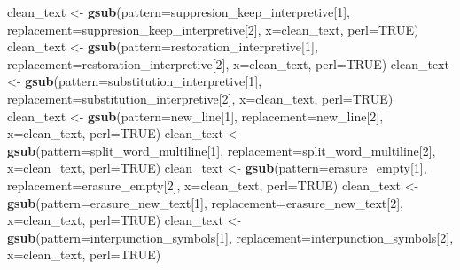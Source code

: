\documentclass[]{article}
\newenvironment{Shaded}{\begin{snugshade}}{\end{snugshade}}
\newcommand{\DataTypeTok}[1]{\textcolor[rgb]{0.13,0.29,0.53}{#1}}
\newcommand{\DecValTok}[1]{\textcolor[rgb]{0.00,0.00,0.81}{#1}}
\newcommand{\KeywordTok}[1]{\textcolor[rgb]{0.13,0.29,0.53}{\textbf{#1}}}
\newcommand{\NormalTok}[1]{#1}
\newcommand{\OtherTok}[1]{\textcolor[rgb]{0.56,0.35,0.01}{#1}}
\newcommand{\StringTok}[1]{\textcolor[rgb]{0.31,0.60,0.02}{#1}}
\begin{document}
\begin{Shaded}
\begin{Highlighting}[]
\NormalTok{  clean_text <-}\StringTok{ }\KeywordTok{gsub}\NormalTok{(}\DataTypeTok{pattern=}\NormalTok{suppresion_keep_interpretive[}\DecValTok{1}\NormalTok{], }\DataTypeTok{replacement=}\NormalTok{suppresion_keep_interpretive[}\DecValTok{2}\NormalTok{], }\DataTypeTok{x=}\NormalTok{clean_text, }\DataTypeTok{perl=}\OtherTok{TRUE}\NormalTok{)}
\NormalTok{  clean_text <-}\StringTok{ }\KeywordTok{gsub}\NormalTok{(}\DataTypeTok{pattern=}\NormalTok{restoration_interpretive[}\DecValTok{1}\NormalTok{], }\DataTypeTok{replacement=}\NormalTok{restoration_interpretive[}\DecValTok{2}\NormalTok{], }\DataTypeTok{x=}\NormalTok{clean_text, }\DataTypeTok{perl=}\OtherTok{TRUE}\NormalTok{)}
\NormalTok{  clean_text <-}\StringTok{ }\KeywordTok{gsub}\NormalTok{(}\DataTypeTok{pattern=}\NormalTok{substitution_interpretive[}\DecValTok{1}\NormalTok{], }\DataTypeTok{replacement=}\NormalTok{substitution_interpretive[}\DecValTok{2}\NormalTok{], }\DataTypeTok{x=}\NormalTok{clean_text, }\DataTypeTok{perl=}\OtherTok{TRUE}\NormalTok{)}
\NormalTok{  clean_text <-}\StringTok{ }\KeywordTok{gsub}\NormalTok{(}\DataTypeTok{pattern=}\NormalTok{new_line[}\DecValTok{1}\NormalTok{], }\DataTypeTok{replacement=}\NormalTok{new_line[}\DecValTok{2}\NormalTok{], }\DataTypeTok{x=}\NormalTok{clean_text, }\DataTypeTok{perl=}\OtherTok{TRUE}\NormalTok{)}
\NormalTok{  clean_text <-}\StringTok{ }\KeywordTok{gsub}\NormalTok{(}\DataTypeTok{pattern=}\NormalTok{split_word_multiline[}\DecValTok{1}\NormalTok{], }\DataTypeTok{replacement=}\NormalTok{split_word_multiline[}\DecValTok{2}\NormalTok{], }\DataTypeTok{x=}\NormalTok{clean_text, }\DataTypeTok{perl=}\OtherTok{TRUE}\NormalTok{)}
\NormalTok{  clean_text <-}\StringTok{ }\KeywordTok{gsub}\NormalTok{(}\DataTypeTok{pattern=}\NormalTok{erasure_empty[}\DecValTok{1}\NormalTok{], }\DataTypeTok{replacement=}\NormalTok{erasure_empty[}\DecValTok{2}\NormalTok{], }\DataTypeTok{x=}\NormalTok{clean_text, }\DataTypeTok{perl=}\OtherTok{TRUE}\NormalTok{)}
\NormalTok{  clean_text <-}\StringTok{ }\KeywordTok{gsub}\NormalTok{(}\DataTypeTok{pattern=}\NormalTok{erasure_new_text[}\DecValTok{1}\NormalTok{], }\DataTypeTok{replacement=}\NormalTok{erasure_new_text[}\DecValTok{2}\NormalTok{], }\DataTypeTok{x=}\NormalTok{clean_text, }\DataTypeTok{perl=}\OtherTok{TRUE}\NormalTok{)}
\NormalTok{  clean_text <-}\StringTok{ }\KeywordTok{gsub}\NormalTok{(}\DataTypeTok{pattern=}\NormalTok{interpunction_symbols[}\DecValTok{1}\NormalTok{], }\DataTypeTok{replacement=}\NormalTok{interpunction_symbols[}\DecValTok{2}\NormalTok{], }\DataTypeTok{x=}\NormalTok{clean_text, }\DataTypeTok{perl=}\OtherTok{TRUE}\NormalTok{)}

\end{Highlighting}
\end{Shaded}
\end{document}
